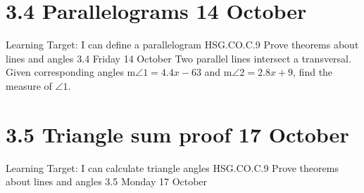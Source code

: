 \section{3.4 Parallelograms \hfill 14 October}
\begin{frame}{Learning Target: I can define a parallelogram}
  {HSG.CO.C.9 Prove theorems about lines and angles  \hfill \alert{3.4 Friday 14 October}}
  Two parallel lines intersect a transversal. Given corresponding angles  m$\angle 1 = 4.4x - 63$ and m$\angle 2 = 2.8x+9$, find the measure of $\angle 1$. 
  \begin{flushright}
    \end{flushright}
\end{frame}

\section{3.5 Triangle sum proof \hfill 17 October}
\begin{frame}{Learning Target: I can calculate triangle angles}
  {HSG.CO.C.9 Prove theorems about lines and angles  \hfill \alert{3.5 Monday 17 October}}

\end{frame}

